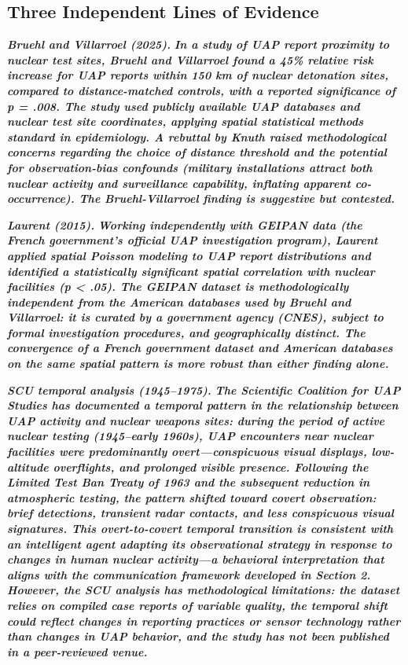 \documentclass[11pt,letterpaper]{article}
\begin{document}
\subsection{Three Independent Lines of Evidence}

\textbf{\textit{Bruehl and Villarroel (2025).}}\textbf{\textit{ In a study of UAP report proximity to nuclear test sites, Bruehl and Villarroel found a 45\% relative risk increase for UAP reports within 150 km of nuclear detonation sites, compared to distance-matched controls, with a reported significance of p = .008. The study used publicly available UAP databases and nuclear test site coordinates, applying spatial statistical methods standard in epidemiology. A rebuttal by Knuth raised methodological concerns regarding the choice of distance threshold and the potential for observation-bias confounds (military installations attract both nuclear activity and surveillance capability, inflating apparent co-occurrence). The Bruehl-Villarroel finding is suggestive but contested.}}


\textbf{\textit{Laurent (2015).}}\textbf{\textit{ Working independently with GEIPAN data (the French government's official UAP investigation program), Laurent applied spatial Poisson modeling to UAP report distributions and identified a statistically significant spatial correlation with nuclear facilities (p < .05). The GEIPAN dataset is methodologically independent from the American databases used by Bruehl and Villarroel: it is curated by a government agency (CNES), subject to formal investigation procedures, and geographically distinct. The convergence of a French government dataset and American databases on the same spatial pattern is more robust than either finding alone.}}


\textbf{\textit{SCU temporal analysis (1945--1975).}}\textbf{\textit{ The Scientific Coalition for UAP Studies has documented a temporal pattern in the relationship between UAP activity and nuclear weapons sites: during the period of active nuclear testing (1945--early 1960s), UAP encounters near nuclear facilities were predominantly overt---conspicuous visual displays, low-altitude overflights, and prolonged visible presence. Following the Limited Test Ban Treaty of 1963 and the subsequent reduction in atmospheric testing, the pattern shifted toward covert observation: brief detections, transient radar contacts, and less conspicuous visual signatures. This overt-to-covert temporal transition is consistent with an intelligent agent adapting its observational strategy in response to changes in human nuclear activity---a behavioral interpretation that aligns with the communication framework developed in Section 2. However, the SCU analysis has methodological limitations: the dataset relies on compiled case reports of variable quality, the temporal shift could reflect changes in reporting practices or sensor technology rather than changes in UAP behavior, and the study has not been published in a peer-reviewed venue.}}
\end{document}

